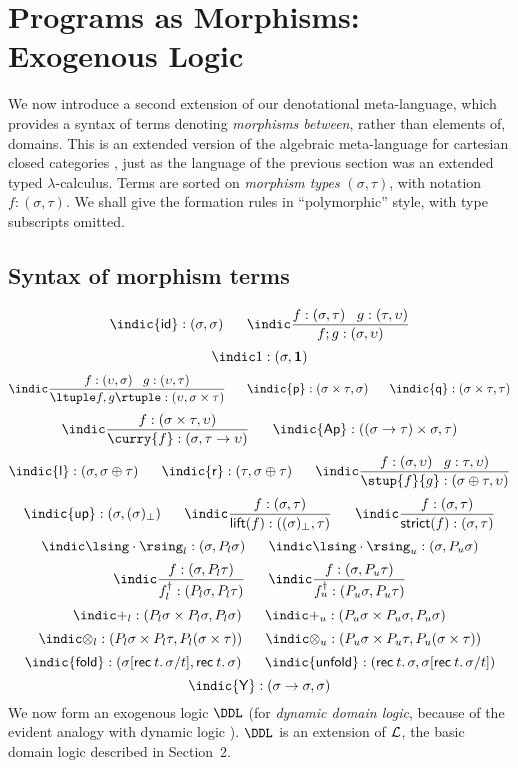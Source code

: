 \section{Programs as Morphisms: Exogenous Logic}
We now introduce a second extension of our denotational meta-language,
which provides a syntax of terms denoting {\em morphisms between},
rather than elements of, domains.
This is an extended version of the algebraic meta-language for cartesian closed
categories \cite{Poi86,LS86}, just as the language of the previous section was an extended typed
$\lambda$-calculus.
Terms are sorted on {\em morphism types} $(\sigma , \tau )$, with notation
$f : (\sigma , \tau )$.
We shall give the formation rules in ``polymorphic'' style, with type
subscripts omitted.
\subsection*{Syntax of morphism terms}
\[ \indic {\sf id} : (\sigma , \sigma ) \;\;\;\;\;\; 
\indic \frac{f : (\sigma , \tau ) \;\;\; g : (\tau , \upsilon )}{f ; g : (\sigma , \upsilon )} \]
\[ \indic 1 : (\sigma , {\bf 1}) \]
\[ \indic \frac{f : (\upsilon , \sigma ) \;\;\; g : (\upsilon , \tau )}{\ltuple f, g \rtuple : (\upsilon , \sigma \times \tau )} \;\;\;\;\;\;
   \indic {\sf p} : (\sigma \times \tau , \sigma ) \;\;\;\;\;\;
\indic {\sf q} : (\sigma \times \tau , \tau ) \]
\[ \indic \frac{f : (\sigma \times \tau , \upsilon )}{\curry{f} : (\sigma , \tau \rightarrow \upsilon )} \;\;\;\;\;\;
\indic {\sf Ap} : ((\sigma \rightarrow \tau ) \times \sigma , \tau ) \]
\[ \indic {\sf l} : (\sigma , \sigma \oplus \tau ) \;\;\;\;\;\;
   \indic {\sf r} : (\tau , \sigma \oplus \tau ) \;\;\;\;\;\;
   \indic \frac{f : (\sigma , \upsilon ) \;\;\; g : \tau , \upsilon )}{\stup{f}{g} : (\sigma \oplus \tau , \upsilon )} \]
\[ \indic {\sf up} : (\sigma , (\sigma )_{\bot}) \;\;\;\;\;\;
 \indic \frac{f : (\sigma , \tau )}{{\sf lift}(f) : ((\sigma)_{\bot}, \tau )} \;\;\;\;\;\;
\indic \frac{f : (\sigma , \tau )}{{\sf strict}(f) : (\sigma , \tau )} \]
\[ \indic \lsing \cdot \rsing_{l} : (\sigma , P_{l} \sigma ) \;\;\;\;\;\;
    \indic \lsing \cdot \rsing_{u} : (\sigma , P_{u} \sigma ) \]
\[ \indic \frac{f : (\sigma , P_{l} \tau )}{f^{\dagger}_{l} : (P_{l} \sigma , P_{l} \tau )} \;\;\;\;\;\;
   \indic \frac{f : (\sigma , P_{u} \tau )}{f^{\dagger}_{u} : (P_{u} \sigma , P_{u} \tau )} \]
\[ \indic +_{l} : (P_{l} \sigma \times P_{l} \sigma , P_{l} \sigma ) \;\;\;\;\;\;
   \indic +_{u} : (P_{u} \sigma \times P_{u} \sigma , P_{u} \sigma ) \]
\[ \indic \otimes_{l} : (P_{l} \sigma \times P_{l} \tau , P_{l} (\sigma \times \tau )) \;\;\;\;\;\;
   \indic \otimes_{u} : (P_{u} \sigma \times P_{u} \tau , P_{u} (\sigma \times \tau )) \]
\[ \indic {\sf fold} : (\sigma [{\sf rec} \: t. \, \sigma /t], {\sf rec} \: t. \, \sigma ) \;\;\;\;\;\;
\indic {\sf unfold} : ( {\sf rec} \: t. \, \sigma , \sigma [{\sf rec} \: t. \, \sigma /t]) \]
\[ \indic {\sf Y} : (\sigma \rightarrow \sigma , \sigma ) \]
We now form an exogenous logic $\DDL$ (for {\em dynamic domain logic}, because of the evident analogy with dynamic logic \cite{Pra79,Har79}).
$\DDL$ is an extension of ${\cal L}$, the basic domain logic described in Section~2.

